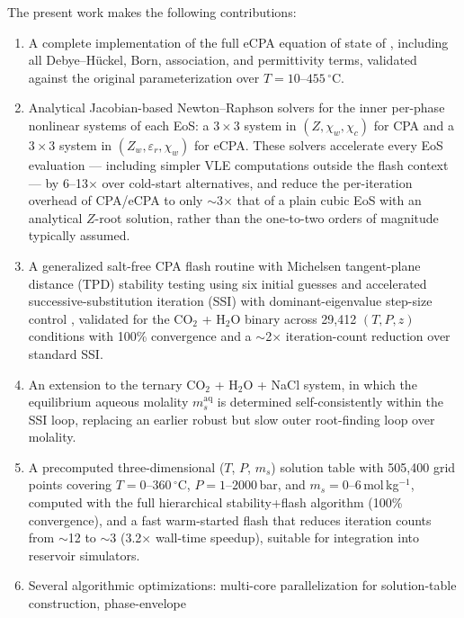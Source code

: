 \documentclass[preprint,12pt,authoryear]{elsarticle}
\begin{document}
The present work makes the following contributions:
\begin{enumerate}
  \item A complete implementation of the full eCPA equation of state of \citet{Coelho2025},
        including all Debye--Hückel, Born, association, and permittivity terms,
        validated against the original parameterization over $T = 10$--$455\,^\circ$C.
  \item Analytical Jacobian-based Newton--Raphson solvers for the inner per-phase
        nonlinear systems of each EoS: a $3\times3$ system in $(Z,\chi_w,\chi_c)$ for CPA
        and a $3\times3$ system in $(Z_w,\varepsilon_r,\chi_w)$ for eCPA.
        These solvers accelerate every EoS evaluation — including simpler VLE
        computations outside the flash context — by 6--13$\times$ over cold-start
        alternatives, and reduce the per-iteration overhead of CPA/eCPA to only
        $\sim$3$\times$ that of a plain cubic EoS with an analytical $Z$-root solution,
        rather than the one-to-two orders of magnitude typically assumed.
  \item A generalized salt-free CPA flash routine with Michelsen tangent-plane distance
        (TPD) stability testing \citep{Michelsen1982a} using six initial guesses
        \citep{Jex2024} and accelerated successive-substitution iteration (SSI) with
        dominant-eigenvalue step-size control \citep{Jex2024}, validated for the
        CO$_2$ + H$_2$O binary across 29{,}412 $(T, P, z)$ conditions with 100\%
        convergence and a $\sim$2$\times$ iteration-count reduction over standard SSI.
  \item An extension to the ternary CO$_2$ + H$_2$O + NaCl system, in which the
        equilibrium aqueous molality $m_s^\mathrm{aq}$ is determined self-consistently within the
        SSI loop, replacing an earlier robust but slow outer root-finding loop over
        molality.
  \item A precomputed three-dimensional ($T$, $P$, $m_s$) solution table with
        505{,}400 grid points covering $T = 0$--$360\,^\circ$C, $P = 1$--$2000$\,bar,
        and $m_s = 0$--$6$\,mol\,kg$^{-1}$, computed with the full hierarchical
        stability+flash algorithm (100\% convergence), and a fast warm-started flash
        that reduces iteration counts from $\sim$12 to $\sim$3 (3.2$\times$ wall-time
        speedup), suitable for integration into reservoir simulators.
  \item Several algorithmic optimizations: multi-core parallelization
        for solution-table construction, phase-envelope

\end{enumerate}
\end{document}
